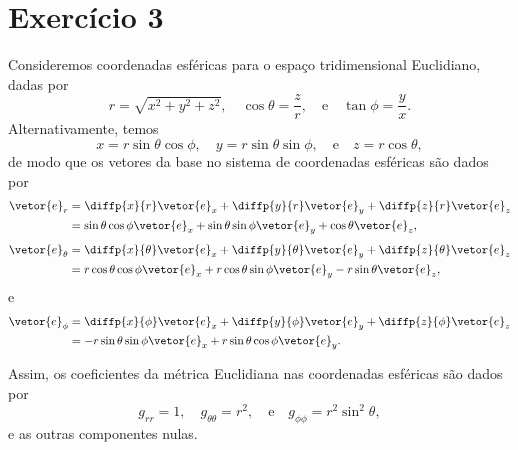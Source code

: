 \section*{Exercício 3}
Consideremos coordenadas esféricas para o espaço tridimensional Euclidiano, dadas por
\begin{equation*}
    r = \sqrt{x^2 + y^2 + z^2},\quad \cos\theta = \frac{z}{r},\quad\text{e}\quad\tan\phi=\frac{y}{x}.
\end{equation*}
Alternativamente, temos
\begin{equation*}
    x = r\sin\theta\cos\phi,\quad y = r\sin\theta\sin\phi,\quad\text{e}\quad z = r\cos\theta,
\end{equation*}
de modo que os vetores da base no sistema de coordenadas esféricas são dados por
\begin{align*}
    \vetor{e}_r &= \diffp{x}{r}\vetor{e}_x + \diffp{y}{r}\vetor{e}_y + \diffp{z}{r}\vetor{e}_z\\
                &= \sin\theta\cos\phi\vetor{e}_x + \sin\theta\sin\phi\vetor{e}_y + \cos\theta \vetor{e}_z,
\end{align*}
\begin{align*}
    \vetor{e}_\theta &= \diffp{x}{\theta}\vetor{e}_x + \diffp{y}{\theta}\vetor{e}_y + \diffp{z}{\theta}\vetor{e}_z \\
                   &= r\cos\theta\cos\phi \vetor{e}_x + r\cos\theta\sin\phi\vetor{e}_y - r\sin\theta\vetor{e}_z,
\end{align*}
e
\begin{align*}
    \vetor{e}_\phi &= \diffp{x}{\phi}\vetor{e}_x + \diffp{y}{\phi}\vetor{e}_y + \diffp{z}{\phi}\vetor{e}_z\\
                   &= -r\sin\theta\sin\phi \vetor{e}_x + r\sin\theta\cos\phi\vetor{e}_y.
\end{align*}

Assim, os coeficientes da métrica Euclidiana nas coordenadas esféricas são dados por
\begin{equation*}
    g_{rr} = 1, \quad g_{\theta\theta} = r^2, \quad\text{e}\quad g_{\phi\phi} = r^2\sin^2\theta,
\end{equation*}
e as outras componentes nulas.

